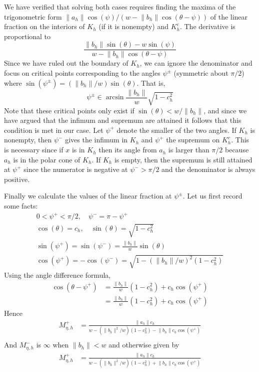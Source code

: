 \documentclass{imsart}
\newcommand{\norm}[1]{\lVert #1 \rVert}
\begin{document}
We have verified that solving both cases requires finding the maxima of the trigonometric form $\norm{a_h} \cos (\psi) / (w - \norm{b_h} \cos(\theta - \psi))$ of the linear fraction on the interiors of $K_h$ (if it is nonempty) and $K_h^c$. The derivative is proportional to
\[
\frac{\norm{b_h} \sin(\theta) - w \sin(\psi)}{w - \norm{b_h} \cos(\theta - \psi)}
\]
Since we have ruled out the boundary of $K_h$, we can ignore the denominator and focus on critical points corresponding to the angles $\psi^{\pm}$ (symmetric about $\pi/2$) where $\sin(\psi^{\pm}) = (\norm{b_h} / w) \sin (\theta)$. That is,
\[
\psi^{\pm} \in \arcsin \frac{\norm{b_h}}{w} \sqrt{1-c_h^2}
\]
Note that these critical points only exist if $\sin(\theta) < w/\norm{b_h}$, and since we have argued that the infimum and supremum are attained it follows that this condition is met in our case. Let $\psi^+$ denote the smaller of the two angles. If $K_h$ is nonempty, then $\psi^-$ gives the infimum in $K_h$ and $\psi^+$ the supremum on $K_h^c$. This is necessary since if $x$ is in $K_h$ then its angle from $a_h$ is larger than $\pi/2$ because $a_h$ is in the polar cone of $K_h$. If $K_h$ is empty, then the supremum is still attained at $\psi^+$ since the numerator is negative at $\psi^- > \pi/2$ and the denominator is always positive.

Finally we calculate the values of the linear fraction at $\psi^{\pm}$. Let us first record some facts:
\begin{align*}
0 < \psi^+ < \pi/2, \quad \psi^- = \pi - \psi^+ \\
\cos(\theta) = c_h, \quad \sin(\theta) = \sqrt{1-c_h^2} \\
\sin(\psi^+) = \sin(\psi^-) = \frac{\norm{b_h}}{w} \sin(\theta) \\
\cos(\psi^+) = -\cos(\psi^-) = \sqrt{1 - (\norm{b_h}/w)^2(1-c_h^2)}
\end{align*}
Using the angle difference formula,
\begin{align*}
\cos(\theta - \psi^+) & = \frac{\norm{b_h}}{w} (1-c_h^2) +  c_h \cos(\psi^+) \\
& = \frac{\norm{b_h}}{w} (1-c_h^2) +  c_h \cos(\psi^+)
\end{align*}
Hence
\begin{align*}
M^+_{\eta, h} & = \frac{ \norm{a_h} c_h }{ w - (\norm{b_h}^2/w) (1-c_h^2) - \norm{b_h} c_h \cos(\psi^+) } \\
\end{align*}
And $M^-_{\eta, h}$ is $\infty$ when $\norm{b_h} < w$ and otherwise given by
\begin{align*}
M^+_{\eta, h} & = \frac{ \norm{a_h} c_h }{ w - (\norm{b_h}^2/w) (1-c_h^2) + \norm{b_h} c_h \cos(\psi^+) } \\
\end{align*}
\end{document}
